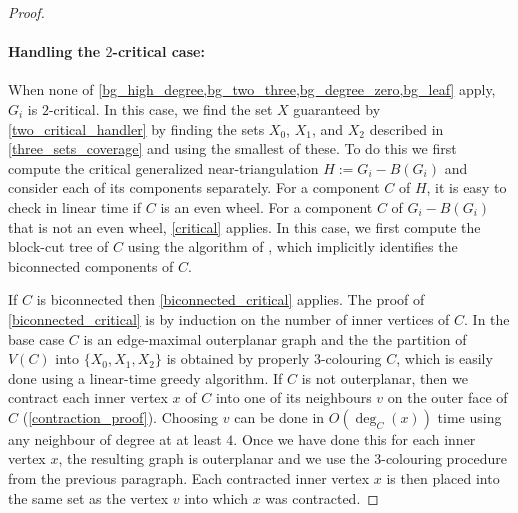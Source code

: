 \documentclass{article}
\newcommand{\pat}[1]{\textcolor{red}{PM: #1}}
\newcommand{\hussein}[1]{\textcolor{purple}{HH: #1}}
\theoremstyle{definition}
\begin{document}
\begin{proof}




\paragraph{Handling the $2$-critical case:}
When none of \cref{bg_high_degree,bg_two_three,bg_degree_zero,bg_leaf} apply, $G_i$ is $2$-critical.  In this case, we find the set $X$ guaranteed by \cref{two_critical_handler} by finding the sets $X_0$, $X_1$, and $X_2$ described in \cref{three_sets_coverage} and using the smallest of these.  To do this we first compute the critical generalized near-triangulation $H:=G_i-B(G_i)$ and consider each of its components separately.  For a component $C$ of $H$, it is easy to check in linear time if $C$ is an even wheel.  For a component $C$ of $G_i-B(G_i)$ that is not an even wheel, \cref{critical} applies.  In this case, we first compute the block-cut tree of $C$ using the algorithm of \citet{hopcroft.tarjan:efficient}, which implicitly identifies the biconnected components of $C$.

If $C$ is biconnected then \cref{biconnected_critical} applies.  The proof of \cref{biconnected_critical} is by induction on the number of inner vertices of $C$.  In the base case $C$ is an edge-maximal outerplanar graph and the the partition of $V(C)$ into $\{X_0,X_1,X_2\}$ is obtained by properly $3$-colouring $C$, which is easily done using a linear-time greedy algorithm. If $C$ is not outerplanar, then we contract each inner vertex $x$ of $C$ into one of its neighbours $v$ on the outer face of $C$ (\cref{contraction_proof}).  Choosing $v$ can be done in $O(\deg_C(x))$ time using any neighbour of degree at at least $4$.  Once we have done this for each inner vertex $x$, the resulting graph is outerplanar and we use the $3$-colouring procedure from the previous paragraph.  Each contracted inner vertex $x$ is then placed into the  same set as the vertex $v$ into which $x$ was contracted.


\end{proof}
\end{document}
